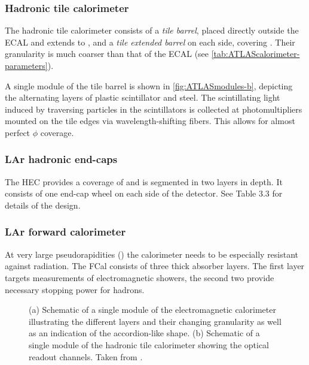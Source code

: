 \subsubsection{Hadronic tile calorimeter}
The hadronic tile calorimeter consists of a \emph{tile barrel}, placed directly outside the ECAL and extends to , and a \emph{tile extended barrel} on each side, covering .
Their granularity is much coarser than that of the ECAL (see \cref{tab:ATLAScalorimeter-parameters}).

A single module of the tile barrel is shown in \cref{fig:ATLASmodules-b}, depicting the alternating layers of plastic scintillator and steel. The scintillating light induced by traversing particles in the scintillators is collected at photomultipliers mounted on the tile edges via wavelength-shifting fibers. This allows for almost perfect $\phi$ coverage.

\subsubsection{LAr hadronic end-caps}
The HEC provides a coverage of  and is segmented in two layers in depth. It consists of one end-cap wheel on each side of the detector. See Table 3.3 for details of the design.

\subsubsection{LAr forward calorimeter}
At very large pseudorapidities () the calorimeter needs to be especially resistant against radiation. The FCal consists of three thick absorber layers. The first layer targets measurements of electromagnetic showers, the second two provide necessary stopping power for hadrons.


\begin{figure}
    \caption[Schematics of single modules of the ATLAS calorimeters.]{(a) Schematic of a single module of the electromagnetic calorimeter illustrating the different layers and their changing granularity as well as an indication of the accordion-like shape. (b) Schematic of a single module of the hadronic tile calorimeter showing the optical readout channels. Taken from .}
    \label{fig:ATLASmodules}
\end{figure}



